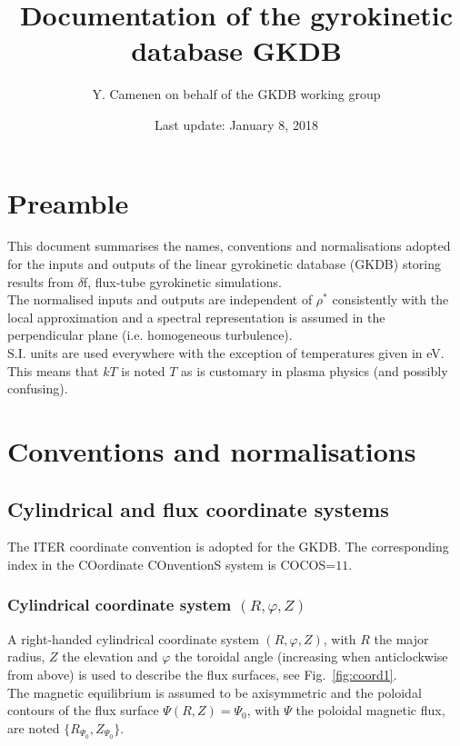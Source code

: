 \documentclass[a4paper]{report}
\begin{document}
\title{Documentation of the  gyrokinetic database GKDB}

\author{Y. Camenen on behalf of the GKDB working group}

\date{Last update: January 8, 2018}

\maketitle


\tableofcontents

\chapter{Preamble}

This document summarises the names, conventions and normalisations adopted for the inputs and outputs of the linear gyrokinetic database (GKDB) storing results from $\delta$f, flux-tube gyrokinetic simulations.\\ 
The normalised inputs and outputs are independent of $\rho^*$ consistently with the local approximation and a spectral representation is assumed in the perpendicular plane (i.e. homogeneous turbulence).\\
S.I. units are used everywhere with the exception of temperatures given in eV. This means that $kT$ is noted $T$ as is customary in plasma physics (and possibly confusing).

\chapter{Conventions and normalisations}
\label{chap:normdef}
\section{Cylindrical and flux coordinate systems}
The ITER coordinate convention is adopted for the GKDB. The corresponding index in the COordinate COnventionS system  \cite{Sauter:CPC2013} is COCOS=$11$.
\subsection{Cylindrical coordinate system $(R,\varphi,Z)$}
A right-handed cylindrical coordinate system $(R,\varphi,Z)$, with $R$ the major radius, $Z$ the elevation and $\varphi$ the toroidal angle (increasing when anticlockwise from above) is used to describe the flux surfaces, see Fig.~\ref{fig:coord1}. \\
The magnetic equilibrium is assumed to be axisymmetric and the poloidal contours of the flux surface $\Psi(R,Z)=\Psi_0$, with $\Psi$ the poloidal magnetic flux, are noted $\{R_{\Psi_0},Z_{\Psi_0}\}$.
\end{document}
